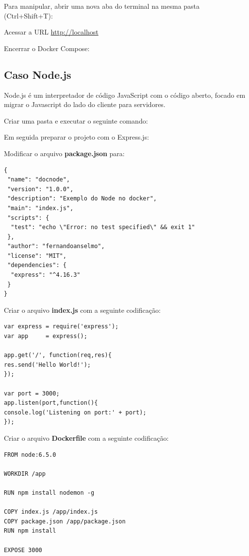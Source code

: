 \documentclass[a4paper,11pt]{article}
\begin{document}
Para manipular, abrir uma nova aba do terminal na mesma pasta (Ctrl+Shift+T): \\

Acessar a URL \url{http://localhost}

Encerrar o Docker Compose: \\

\subsection{Caso Node.js}
Node.js é um interpretador de código JavaScript com o código aberto, focado em migrar o Javascript do lado do cliente para servidores. 

Criar uma pasta e executar o seguinte comando: \\

Em seguida preparar o projeto com o Express.js: \\

Modificar o arquivo \textbf{package.json} para:
\begin{lstlisting}
{
 "name": "docnode",
 "version": "1.0.0",
 "description": "Exemplo do Node no docker",
 "main": "index.js",
 "scripts": {
  "test": "echo \"Error: no test specified\" && exit 1"
 },
 "author": "fernandoanselmo",
 "license": "MIT",
 "dependencies": {
  "express": "^4.16.3"
 }
}
\end{lstlisting}

Criar o arquivo \textbf{index.js} com a seguinte codificação:
\begin{lstlisting}
var express = require('express');
var app     = express();

app.get('/', function(req,res){
res.send('Hello World!');
});

var port = 3000;
app.listen(port,function(){
console.log('Listening on port:' + port);
});
\end{lstlisting}

Criar o arquivo \textbf{Dockerfile} com a seguinte codificação:
\begin{lstlisting}
FROM node:6.5.0

WORKDIR /app

RUN npm install nodemon -g

COPY index.js /app/index.js
COPY package.json /app/package.json
RUN npm install

EXPOSE 3000
\end{lstlisting}
\end{document}
